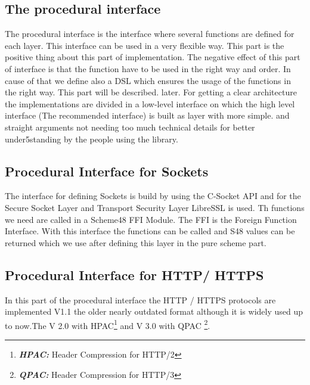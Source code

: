 \documentclass[10pt,a4paper,english]{article}
\newcommand{\abbrhighcol}[1]{\textbf{\textit{#1}}}
\begin{document}
\begin{multicols}{2}
\subsection{The procedural interface}
\begin{flushleft}
The procedural interface is the interface where several functions are defined for each layer. This interface can be used in a very flexible way. This part is the positive thing about this part of implementation. The negative effect of this part of interface is that the function have to be used in the right way and order. In cause of that we define also a DSL which ensures the usage of the functions in the right way. This part will be described. later. 
For getting a clear architecture the implementations are divided in a low-level interface on which the high level interface (The recommended interface) is built as layer with more simple. and straight arguments not needing too much technical details for better under5standing by the people using the library. 
\end{flushleft}


\subsection{Procedural Interface for Sockets}
\begin{flushleft}
The interface for defining Sockets is build by using the C-Socket API and for the Secure Socket Layer and Transport Security Layer LibreSSL is used.
Th functions we need are called in a Scheme48 FFI Module. The FFI is the Foreign Function Interface. With this interface the functions can be called and S48 values can be returned which we use after defining this layer in the pure scheme part.  
\end{flushleft}

\subsection{Procedural Interface for HTTP/ HTTPS}
\begin{flushleft}
In this part of the procedural interface the HTTP / HTTPS protocols are implemented V1.1 the older nearly outdated format although it is widely used up to now.The V 2.0 with HPAC\footnote{\abbrhighcol{HPAC: } Header Compression for HTTP/2} and V 3.0 with QPAC \footnote{\abbrhighcol{QPAC: } Header Compression for HTTP/3}.  
\end{flushleft}



\end{multicols}
\end{document}
